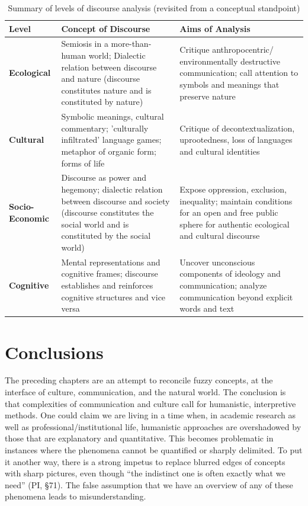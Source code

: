 \begin{table}[h]
\centering
\begin{footnotesize}
\def\arraystretch{1.5}%
\begin{tabular}{| P{3cm} | P{4cm} | P{4cm} | }  
 \hline
\textbf{Level} & \textbf{Concept of Discourse} & \textbf{Aims of Analysis} \\
 \hline
\textbf{Ecological} & Semiosis in a more-than-human world; Dialectic relation between discourse and nature (discourse constitutes nature and is constituted by nature) & Critique anthropocentric/ environmentally destructive communication; call attention to symbols and meanings that preserve nature \\
 \hline
\textbf{Cultural} & Symbolic meanings, cultural commentary; 'culturally infiltrated' language games; metaphor of organic form; forms of life & Critique of decontextualization, uprootedness, loss of languages and cultural identities \\
 \hline
\textbf{Socio-Economic} & Discourse as power and hegemony; dialectic relation between discourse and society (discourse constitutes the social world and is constituted by the social world) & Expose oppression, exclusion, inequality; maintain conditions for an open and free public sphere for authentic ecological and cultural discourse \\
 \hline
\textbf{Cognitive} & Mental representations and cognitive frames; discourse establishes and reinforces cognitive structures and vice versa & Uncover unconscious components of ideology and communication; analyze communication beyond explicit words and text \\
 \hline
\end{tabular}
\caption{Summary of levels of discourse analysis (revisited from a conceptual standpoint)}
\label{tab:table1}
\end{footnotesize}
\end{table}


\section{Conclusions}
 
The preceding chapters are an attempt to reconcile fuzzy concepts, at the interface of culture, communication, and the natural world. The conclusion is that complexities of communication and culture call for humanistic, interpretive methods. One could claim we are living in a time when, in academic research as well as professional/institutional life, humanistic approaches are overshadowed by those that are explanatory and quantitative. This becomes problematic in instances where the phenomena cannot be quantified or sharply delimited. To put it another way, there is a strong impetus to replace blurred edges of concepts with sharp pictures, even though ``the indistinct one is often exactly what we need'' (PI, \S   71). The false assumption that we have an overview of any of these phenomena leads to misunderstanding. 

